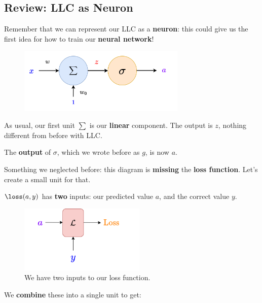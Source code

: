     \subsection*{Review: LLC as Neuron}
    
        Remember that we can represent our LLC as a \textbf{neuron}: this could give us the first idea for how to train our \textbf{neural network}!
        
        \begin{figure}[H]
            \centering
            \includegraphics[width=80mm,scale=0.4]{images/nn_1_5_images/llc_as_neuron.png}
        \end{figure}
        
        As usual, our first unit $\sum$ is our \textbf{linear} component. The output is $z$, nothing different from before with LLC.
        
        The \textbf{output} of $\sigma$, which we wrote before as $g$, is now $a$.
        
        Something we neglected before: this diagram is \textbf{missing} the \textbf{loss function}. Let's create a small unit for that. 
        
        $\loss(a,y)$ has \textbf{two} inputs: our predicted value $a$, and the correct value $y$. 
        
        \begin{figure}[H]
            \centering
            \includegraphics[width=60mm,scale=0.4]{images/nn_1_5_images/loss_unit.png}
            \caption*{We have two inputs to our loss function.}
        \end{figure}
        
        We \textbf{combine} these into a single unit to get:
        
